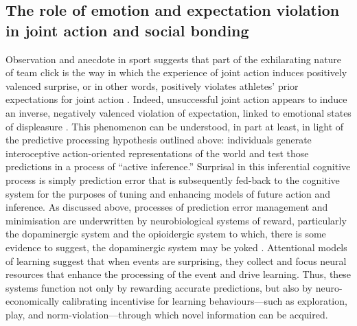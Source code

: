 \begin{mccorrection}
\subsection{The role of emotion and expectation violation in joint action and social bonding}
Observation and anecdote in sport suggests that part of the exhilarating nature of team click is the way in which the experience of joint action induces positively valenced surprise, or in other words, positively violates athletes' prior expectations for joint action \citep{Jackson1999}.  Indeed, unsuccessful joint action appears to induce an inverse, negatively valenced violation of expectation, linked to emotional states of displeasure \citep{Ekkekakis2003}.  This phenomenon can be understood, in part at least, in light of the predictive processing hypothesis outlined above: individuals generate interoceptive action-oriented representations of the world and test those predictions in a process of ``active inference.'' Surprisal in this inferential cognitive process is simply prediction error that is subsequently fed-back to the cognitive system for the purposes of tuning and enhancing models of future action and inference\citep{Clark2013}.
As discussed above, processes of prediction error management and minimisation are underwritten by neurobiological systems of reward, particularly the dopaminergic system \citep{Schultz2013} and the opioidergic system to which, there is some evidence to suggest, the dopaminergic system may be yoked \citep{Pecina2013,Laurent2014}. Attentional models of learning suggest that when events are surprising, they collect and focus neural resources that enhance the processing of the event and drive learning. Thus, these systems function not only by rewarding accurate predictions, but also by neuro-economically calibrating incentivise for learning behaviours---such as exploration, play, and norm-violation---through which novel information can be acquired\citep{Little2013}.


\end{mccorrection}
